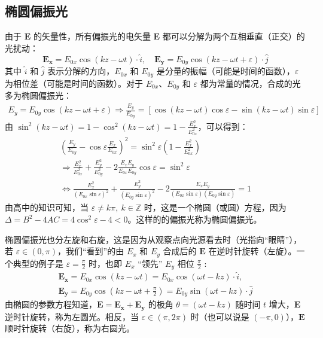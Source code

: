 \documentclass[UTF8]{report}
\def\Z{\mathbb{Z}}
\theoremstyle{MyLineTheoremStyle} %
\theoremstyle{MyBlockTheoremStyle} %
\theoremstyle{MySubsubsectionStyle} %
\begin{document}
\subsection{椭圆偏振光}
由于 $\boldsymbol{E}$ 的矢量性，所有偏振光的电矢量 $\boldsymbol{E}$ 都可以分解为两个互相垂直（正交）的光扰动：
\begin{equation}
\boldsymbol{E_x} =  E_{0x} \cos(kz - \omega t) \cdot \hat{i},\quad \boldsymbol{E_y} =  E_{0y} \cos(kz - \omega t + \varepsilon) \cdot \hat{j}
\end{equation}
其中 $\hat{i}$ 和 $\hat{j}$ 表示分解的方向，$E_{0x}$ 和 $E_{0y}$ 是分量的振幅（可能是时间的函数），$\varepsilon$ 为相位差（可能是时间的函数）。对于 $E_{0x}$、$E_{0y}$ 和 $\varepsilon$ 都为常量的情况，合成的光多为椭圆偏振光：
\begin{gather}
    E_y = E_{0y} \cos(kz - \omega t + \varepsilon) \Longrightarrow 
    \frac{E_y}{E_{0y}} = 
    \left[\cos(kz - \omega t) \cos \varepsilon - \sin(kz - \omega t) \sin \varepsilon\right] 
\end{gather}
由 $\sin^2 (kz - \omega t) = 1 - \cos^2 (kz - \omega t) = 1 - \frac{E_x^2}{E_{0x}^2}$，可以得到：
\begin{gather}
\left( \frac{E_y}{E_{0y}} -  \cos \varepsilon\frac{E_x}{E_{0x}} \right)^2 = \sin^2 \varepsilon \left( 1 - \frac{E_x^2}{E_{0x}^2} \right) \\ 
\Longrightarrow 
\frac{E_x^2}{E_{0x}^2} + \frac{E_y^2}{E_{0y}^2} - 2 \frac{E_xE_y}{E_{0x}E_{0y}} \cos \varepsilon = \sin^2 \varepsilon 
\\ \label{eq:椭圆偏振光}
\Longleftrightarrow \frac{E_x^2}{(E_{0x} \sin \varepsilon)^2} + \frac{E_y^2}{(E_{0y} \sin \varepsilon)^2} - 2 \frac{E_xE_y}{(E_{0x} \sin \varepsilon )(E_{0y} \sin \varepsilon)} = 1
\end{gather}
由高中的知识可知，当 $\varepsilon \ne k \pi,\  k \in \Z$ 时，这是一个椭圆（或圆）方程，因为 $\Delta = B^2 - 4AC = 4 \cos^2 \varepsilon - 4 < 0$。这样的的偏振光称为椭圆偏振光。

椭圆偏振光也分左旋和右旋，这是因为从观察点向光源看去时（光指向“眼睛”），若 $\varepsilon \in (0, \pi)$，我们“看到”的由 $E_x$ 和 $E_y$ 合成后的 $\boldsymbol{E}$ 在逆时针旋转（左旋）。一个典型的例子是 $\varepsilon = \frac{\pi}{2}$ 时，也即 $E_x$ “领先” $E_y$ 相位 $\frac{\pi}{2}$ :
\begin{gather}
\boldsymbol{E_x} = E_{0x} \cos (kz - \omega t) = E_{0x} \cos (\omega t - kz) \cdot \hat{i},\quad \\ 
\boldsymbol{E_y} = E_{0y} \cos (kz - \omega t + \frac{\pi}{2}) 
= E_{0y} \sin (\omega t - kz) \cdot \hat{j}
\end{gather}
由椭圆的参数方程知道，$\boldsymbol{E} = \boldsymbol{E_x} + \boldsymbol{E_y}$ 的极角 $\theta = (\omega t - kz)$ 随时间 $t$ 增大，$\boldsymbol{E}$ 逆时针旋转，称为左圆光。相反，当 $\varepsilon \in (\pi, 2\pi)$ 时（也可以说是 $(-\pi, 0)$），$\boldsymbol{E}$ 顺时针旋转（右旋），称为右圆光。
\end{document}
